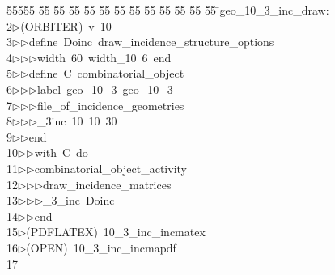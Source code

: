 %
%
\begin{tabbing}
55555 \= 55 \= 55 \= 55 \= 55 \= 55 \= 55 \= 55 \= 55 \= 55 \= 55 \= 55 \= 55 \= \>geo\_10\_3\_inc\_draw:\\[0pt]
2\>$\triangleright$\>(ORBITER)\ v\ 10\ \\[0pt]
3\>$\triangleright$\>$\triangleright$\>define\ Doinc\ draw\_incidence\_structure\_options\ \\[0pt]
4\>$\triangleright$\>$\triangleright$\>$\triangleright$\>width\ 60\ width\_10\ 6\ end\ \\[0pt]
5\>$\triangleright$\>$\triangleright$\>define\ C\ combinatorial\_object\ \\[0pt]
6\>$\triangleright$\>$\triangleright$\>$\triangleright$\>label\ geo\_10\_3\ geo\_10\_3\ \\[0pt]
7\>$\triangleright$\>$\triangleright$\>$\triangleright$\>file\_of\_incidence\_geometries\ \\[0pt]
8\>$\triangleright$\>$\triangleright$\>$\triangleright$\_3inc\ 10\ 10\ 30\ \\[0pt]
9\>$\triangleright$\>$\triangleright$\>end\ \\[0pt]
10\>$\triangleright$\>$\triangleright$\>with\ C\ do\ \\[0pt]
11\>$\triangleright$\>$\triangleright$\>combinatorial\_object\_activity\ \\[0pt]
12\>$\triangleright$\>$\triangleright$\>$\triangleright$\>draw\_incidence\_matrices\ \\[0pt]
13\>$\triangleright$\>$\triangleright$\>$\triangleright$\_3\_inc\ Doinc\ \\[0pt]
14\>$\triangleright$\>$\triangleright$\>end\\[0pt]
15\>$\triangleright$\>(PDFLATEX)\ 10\_3\_inc\_incmatex\\[0pt]
16\>$\triangleright$\>(OPEN)\ 10\_3\_inc\_incmapdf\\[0pt]
17\>\end{tabbing}
